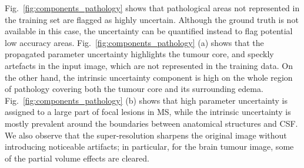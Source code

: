
Fig.~\ref{fig:components_pathology} shows that pathological areas not represented in the training set are flagged as highly uncertain. Although the ground truth is not available in this case, the uncertainty can be quantified instead to flag potential low accuracy areas. Fig.~\ref{fig:components_pathology} (a) shows that the propagated parameter uncertainty highlights the tumour core, and speckly artefacts in the input image, which are not represented in the training data. On the other hand, the intrinsic uncertainty component is high on the whole region of pathology covering both the tumour core and its surrounding edema. Fig.~\ref{fig:components_pathology} (b) shows that high parameter uncertainty is assigned to a large part of focal lesions in MS, while the intrinsic uncertainty is mostly prevalent around the boundaries between anatomical structures and CSF. We also observe that the super-resolution sharpens the original image without introducing noticeable artifacts; in particular, for the brain tumour image, some of the partial volume effects are cleared. 



